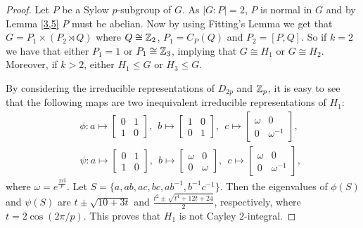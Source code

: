 \documentclass{amsart}
\def \leq {\leqslant}
\def \geq {\geqslant}
\begin{document}
	\begin{proof}	 
	Let $P$ be a Sylow $p$-subgroup of $G$. As $|G:P|=2$, $P$ is normal in $G$ and by Lemma \ref{3,5} $P$ must be abelian. Now by using Fitting's Lemma we get that $G= P_1\times (P_2\rtimes Q)$ where $Q\cong \Bbb Z_2$, $P_1=C_P(Q)$  and $P_2=[P, Q]$. So if $k=2$ we have that either $P_1=1$ or $P_1\cong \Bbb Z_3$, implying that $G\cong H_1$ or $G\cong H_2$. Moreover, if $k>2$, either $H_1\leq G$ or $H_3\leq G$. 
	
	

 By considering the irreducible representations of $D_{2p}$ and $\Bbb Z_p$, it is easy to see that the following maps are two inequivalent irreducible representations of $H_1$:
\begin{eqnarray*}
	&&\phi: a\mapsto \begin{bmatrix}
		0&1\\
		1&0
	\end{bmatrix},~~b\mapsto \begin{bmatrix}
		1&0\\
		0&1
	\end{bmatrix},~~c\mapsto\begin{bmatrix}
		\omega&0\\
		0&\omega^{-1}
	\end{bmatrix},\\
	&&\psi: a\mapsto \begin{bmatrix}
		0&1\\
		1&0
	\end{bmatrix},~~b\mapsto \begin{bmatrix}
		\omega&0\\
		0&\omega
	\end{bmatrix},~~c\mapsto\begin{bmatrix}
		\omega&0\\
		0&\omega^{-1}
	\end{bmatrix},
\end{eqnarray*}
where $\omega=e^{\frac{2\pi\textbf{i}}{p}}$. Let $S=\{ a, ab, ac, bc, ab^{-1}, b^{-1}c^{-1} \}$. Then the eigenvalues of $\phi(S)$ and $\psi(S)$ are $t\pm\sqrt{10+3t}$ and $\frac{t^2\pm\sqrt{t^4+12t+24}}{2}$, respectively, where $t=2\cos(2\pi/p)$. This proves that $H_1$ is not Cayley $2$-integral.


\end{proof}
\end{document}
